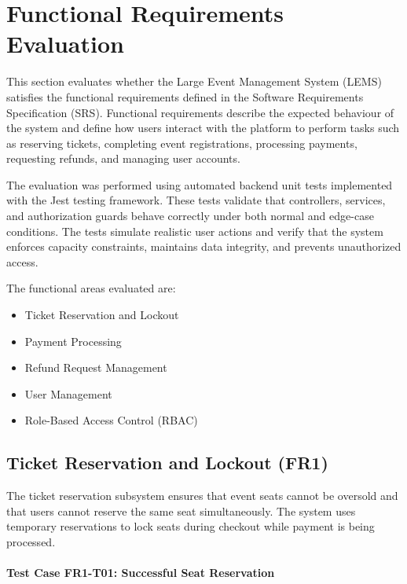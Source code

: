 \documentclass[12pt, titlepage]{article}
\begin{document}
\tableofcontents

\listoftables

\listoffigures

\newpage



\section{Functional Requirements Evaluation}
\label{sec:functional}

This section evaluates whether the Large Event Management System (LEMS) satisfies the functional requirements defined in the Software Requirements Specification (SRS). Functional requirements describe the expected behaviour of the system and define how users interact with the platform to perform tasks such as reserving tickets, completing event registrations, processing payments, requesting refunds, and managing user accounts.

The evaluation was performed using automated backend unit tests implemented with the Jest testing framework. These tests validate that controllers, services, and authorization guards behave correctly under both normal and edge-case conditions. The tests simulate realistic user actions and verify that the system enforces capacity constraints, maintains data integrity, and prevents unauthorized access.

The functional areas evaluated are:

\begin{itemize}
\item Ticket Reservation and Lockout
\item Payment Processing
\item Refund Request Management
\item User Management
\item Role-Based Access Control (RBAC)
\end{itemize}


\subsection{Ticket Reservation and Lockout (FR1)}

The ticket reservation subsystem ensures that event seats cannot be oversold and that users cannot reserve the same seat simultaneously. The system uses temporary reservations to lock seats during checkout while payment is being processed.

\paragraph{Test Case FR1-T01: Successful Seat Reservation}
\end{document}
